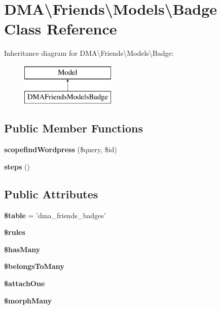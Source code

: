\hypertarget{classDMA_1_1Friends_1_1Models_1_1Badge}{\section{D\-M\-A\textbackslash{}Friends\textbackslash{}Models\textbackslash{}Badge Class Reference}
\label{classDMA_1_1Friends_1_1Models_1_1Badge}
}
Inheritance diagram for D\-M\-A\textbackslash{}Friends\textbackslash{}Models\textbackslash{}Badge\-:\begin{figure}[H]
\begin{center}
\leavevmode
\includegraphics[height=2.000000cm]{df/d98/classDMA_1_1Friends_1_1Models_1_1Badge}
\end{center}
\end{figure}
\subsection*{Public Member Functions}
\begin{DoxyCompactItemize}
\item 
\hypertarget{classDMA_1_1Friends_1_1Models_1_1Badge_a5ebdc91135362ca2b0225fdb0c965127}{{\bfseries scopefind\-Wordpress} (\$query, \$id)}\label{classDMA_1_1Friends_1_1Models_1_1Badge_a5ebdc91135362ca2b0225fdb0c965127}

\item 
\hypertarget{classDMA_1_1Friends_1_1Models_1_1Badge_ac40fb9fa1c7f70f29bb90e77b8f9c8aa}{{\bfseries steps} ()}\label{classDMA_1_1Friends_1_1Models_1_1Badge_ac40fb9fa1c7f70f29bb90e77b8f9c8aa}

\end{DoxyCompactItemize}
\subsection*{Public Attributes}
\begin{DoxyCompactItemize}
\item 
\hypertarget{classDMA_1_1Friends_1_1Models_1_1Badge_aa58560300753d15561b1a979aa21b8fd}{{\bfseries \$table} = 'dma\-\_\-friends\-\_\-badges'}\label{classDMA_1_1Friends_1_1Models_1_1Badge_aa58560300753d15561b1a979aa21b8fd}

\item 
{\bfseries \$rules}
\item 
{\bfseries \$has\-Many}
\item 
{\bfseries \$belongs\-To\-Many}
\item 
{\bfseries \$attach\-One}
\item 
{\bfseries \$morph\-Many}
\end{DoxyCompactItemize}
